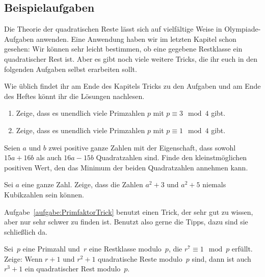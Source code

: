 \subsection*{Beispielaufgaben}

Die Theorie der quadratischen Reste lässt sich auf vielfältige Weise in Olympiade-Aufgaben anwenden. Eine Anwendung haben wir im letzten Kapitel schon gesehen: Wir können sehr leicht bestimmen, ob eine gegebene Restklasse ein quadratischer Rest ist. Aber es gibt noch viele weitere Tricks, die ihr euch in den folgenden Aufgaben selbst erarbeiten sollt.

Wie üblich findet ihr am Ende des Kapitels Tricks zu den Aufgaben und am Ende des Heftes könnt ihr die Lösungen nachlesen.

\begin{aufgabe*}\leavevmode\label{aufgabe:PrimzahlsatzVonDirichletMod4}
	\begin{enumerate}[label={$(\alph*)$},ref={$(\alph*)$}]
		\item Zeige, dass es unendlich viele Primzahlen $p$ mit $p\equiv 3\mod 4$ gibt.\label{teilaufgabe:3Mod4}
		\item Zeige, dass es unendlich viele Primzahlen $p$ mit $p\equiv 1\mod 4$ gibt.\label{teilaufgabe:1Mod4}
	\end{enumerate}
\end{aufgabe*}
\begin{aufgabe*}[*]\label{aufgabe:IMO1996_4}
	Seien $a$ und $b$ zwei positive ganze Zahlen mit der Eigenschaft, dass sowohl $15a+16b$ als auch $16a-15b$ Quadratzahlen sind. Finde den kleinstmöglichen positiven Wert, den das Minimum der beiden Quadratzahlen annehmen kann.
\end{aufgabe*}
\begin{aufgabe*}[*]\label{aufgabe:PrimfaktorTrick}
	Sei $a$ eine ganze Zahl. Zeige, dass die Zahlen $a^2+3$ und $a^2+5$ niemals Kubikzahlen sein können.
\end{aufgabe*}
Aufgabe~\ref{aufgabe:PrimfaktorTrick} benutzt einen Trick, der sehr gut zu wissen, aber nur sehr schwer zu finden ist. Benutzt also gerne die Tipps, dazu sind sie schließlich da.
\begin{aufgabe*}[**]\label{aufgabe:Polen2019}
	Sei~$p$ eine Primzahl und~$r$ eine Restklasse modulo~$p$, die $r^7\equiv 1\mod p$ erfüllt. Zeige: Wenn $r+1$ und $r^2+1$ quadratische Reste modulo~$p$ sind, dann ist auch $r^3+1$ ein quadratischer Rest modulo~$p$.
\end{aufgabe*}


